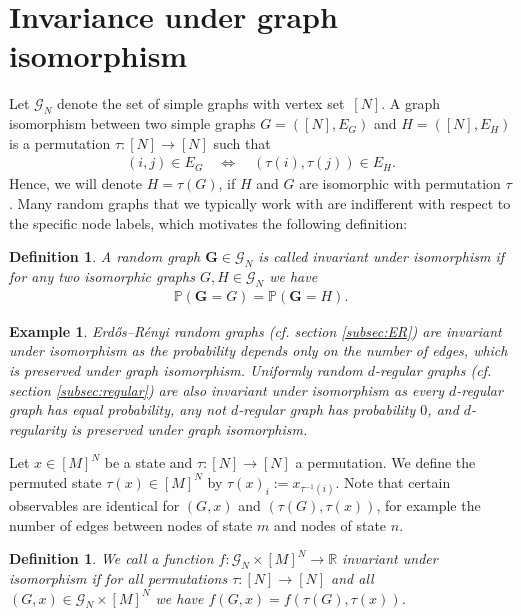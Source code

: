 \documentclass[a4paper,
               10pt,
               pdftex,
               normalheadings,
               headsepline,
               footsepline,
               headinclude,
               footinclude,
               DIV=14,
               abstracton]
{scrartcl}
\newtheorem{definition}[theorem]{Definition}
\newtheorem{example}[theorem]{Example}
\newcommand{\rv}[1]{\bm{#1}}
\begin{document}
\section{Invariance under graph isomorphism} \label{sec:appendix_isomorph}
Let $\mathcal{G}_N$ denote the set of simple graphs with vertex set~$[N]$.
A graph isomorphism between two simple graphs $G = ([N], E_G)$ and $H = ([N], E_H)$ is a permutation $\tau: [N] \to [N]$ such that
\begin{align}
    (i,j) \in E_G \quad \Leftrightarrow \quad (\tau(i), \tau(j)) \in E_H. 
\end{align}
Hence, we will denote $H = \tau(G)$, if $H$ and $G$ are isomorphic with permutation $\tau$.
Many random graphs that we typically work with are indifferent with respect to the specific node labels, which motivates the following definition:
\begin{definition}
A random graph $\rv{G} \in \mathcal{G}_N$ is called invariant under isomorphism if for any two isomorphic graphs $G, H \in \mathcal{G}_N$ we have
\begin{align}
    \mathbb{P}(\rv{G} = G) = \mathbb{P}(\rv{G} = H).
\end{align}
\end{definition}

\begin{example}
Erd\H{o}s--Rényi random graphs (cf. section \ref{subsec:ER}) are invariant under isomorphism as the probability depends only on the number of edges, which is preserved under graph isomorphism.
Uniformly random $d$-regular graphs (cf. section \ref{subsec:regular}) are also invariant under isomorphism as every $d$-regular graph has equal probability, any not $d$-regular graph has probability $0$, and $d$-regularity is preserved under graph isomorphism.
\end{example}

Let $x \in [M]^N$ be a state and $\tau:[N]\to[N]$ a permutation. We define the permuted state $\tau(x) \in [M]^N$ by $\tau(x)_i := x_{\tau^{-1}(i)}$.
Note that certain observables are identical for $(G,x)$ and $(\tau(G), \tau(x))$, for example the number of edges between nodes of state $m$ and nodes of state $n$.
\begin{definition}
We call a function $f:\mathcal{G}_N \times [M]^N \to \mathbb{R}$ \textit{invariant under isomorphism} if for all permutations $\tau:[N]\to[N]$ and all $(G,x) \in \mathcal{G}_N \times [M]^N$ we have $f(G, x) = f(\tau(G), \tau(x))$.
\end{definition}
\end{document}
